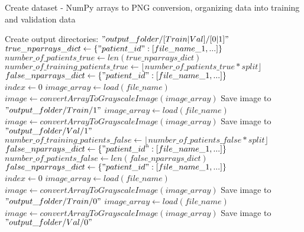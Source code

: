\begin{algorithm}
    \caption{Create dataset - NumPy arrays to PNG conversion, organizing data into training and validation data}
    \label{alg:create_dataset}
    \begin{algorithmic}[1] %
        		\State Create output directories: $"output\_folder/[Train|Val]/[0|1]"$\\
        		\State $true\_nparrays\_dict \gets \{"patient\_id" : [file\_name\_1, ...]\}$
        		\State $number\_of\_patients\_true \gets len(true\_nparrays\_dict)$
        		\State $number\_of\_training\_patients\_true \gets \lfloor number\_of\_patients\_true * split \rfloor$
        		\State $false\_nparrays\_dict \gets \{"patient\_id" : [file\_name\_1, ...]\}$\\
        		\State $index \gets 0$
        			 
        					\State $image\_array \gets load(file\_name)$
        					\State $image \gets convertArrayToGrayscaleImage(image\_array)$
        					\State Save image to $"output\_folder/Train/1"$
        				\EndFor
        			\Else {}
        					\State $image\_array \gets load(file\_name)$
        					\State $image \gets convertArrayToGrayscaleImage(image\_array)$
        					\State Save image to $"output\_folder/Val/1"$
        				\EndFor
        			\EndIf
        		\EndFor\\
        		\State $number\_of\_training\_patients\_false \gets \lfloor number\_of\_patients\_false * split \rfloor$
        		\State $false\_nparrays\_dict \gets \{"patient\_id" : [file\_name\_1, ...]\}$
        		\State $number\_of\_patients\_false \gets len(false\_nparrays\_dict)$
        		\State $false\_nparrays\_dict \gets \{"patient\_id" : [file\_name\_1, ...]\}$\\
        		\State $index \gets 0$
        			 
        					\State $image\_array \gets load(file\_name)$
        					\State $image \gets convertArrayToGrayscaleImage(image\_array)$
        					\State Save image to $"output\_folder/Train/0"$
        				\EndFor
        			\Else {}
        					\State $image\_array \gets load(file\_name)$
        					\State $image \gets convertArrayToGrayscaleImage(image\_array)$
        					\State Save image to $"output\_folder/Val/0"$
        				\EndFor
        			\EndIf
        		\EndFor
        \EndProcedure
    \end{algorithmic}
\end{algorithm}

